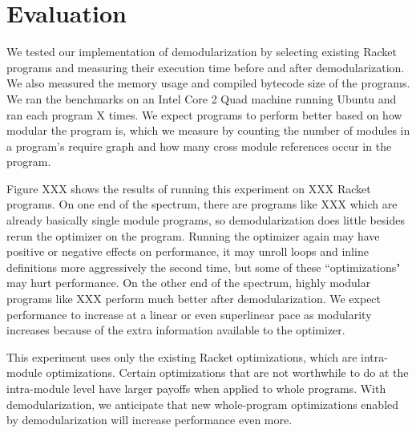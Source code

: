\chapter{Evaluation}
\label{chap:evaluation}

We tested our implementation of demodularization by selecting existing Racket programs and measuring their execution time before and after demodularization.
We also measured the memory usage and compiled bytecode size of the programs.
We ran the benchmarks on an Intel Core 2 Quad machine running Ubuntu and ran each program X times.
We expect programs to perform better based on how modular the program is, which we measure by counting the number of modules in a program's require graph and how many cross module references occur in the program.

Figure XXX shows the results of running this experiment on XXX Racket programs. 
On one end of the spectrum, there are programs like XXX which are already basically single module programs, so demodularization does little besides rerun the optimizer on the program. Running the optimizer again may have positive or negative effects on performance, it may unroll loops and inline definitions more aggressively the second time, but some of these ``optimizations" may hurt performance.
On the other end of the spectrum, highly modular programs like XXX perform much better after demodularization.
We expect performance to increase at a linear or even superlinear pace as modularity increases because of the extra information available to the optimizer.

This experiment uses only the existing Racket optimizations, which are intra-module optimizations.
Certain optimizations that are not worthwhile to do at the intra-module level have larger payoffs when applied to whole programs. 
With demodularization, we anticipate that new whole-program optimizations enabled by demodularization will increase performance even more.

